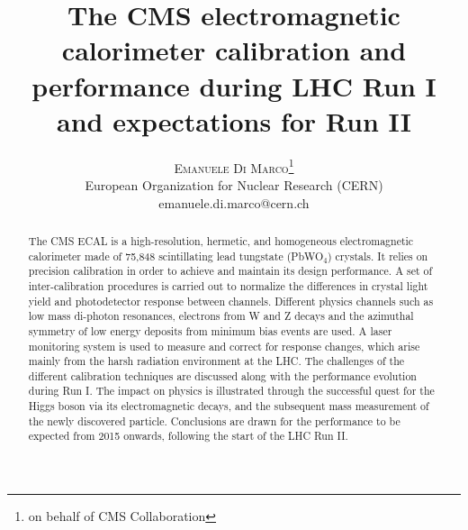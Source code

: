 \documentclass[11pt]{article}
\title{\vspace{-15mm}\fontsize{14pt}{8pt}\selectfont\textbf{The CMS electromagnetic calorimeter calibration and  performance during LHC Run I and expectations for Run II}} %
\author{
\large
\textsc{Emanuele Di Marco}\thanks{ on behalf of CMS Collaboration}\\[2mm] %
European Organization for Nuclear Research (CERN) \\ %
emanuele.di.marco@cern.ch %
\vspace{-5mm}
}
\date{}
\begin{document}
\maketitle %


\begin{abstract}
\noindent The CMS ECAL is a high-resolution, hermetic, and homogeneous
electromagnetic calorimeter made of 75,848 scintillating lead
tungstate (PbWO$_4$) crystals. It relies on precision calibration in
order to achieve and maintain its design performance. A set of
inter-calibration procedures is carried out to normalize the
differences in crystal light yield and photodetector response between
channels. Different physics channels such as low mass di-photon
resonances, electrons from W and Z decays and the azimuthal symmetry
of low energy deposits from minimum bias events are used. A laser
monitoring system is used to measure and correct for response changes,
which arise mainly from the harsh radiation environment at the
LHC. The challenges of the different calibration techniques are
discussed along with the performance evolution during Run I. The
impact on physics is illustrated through the successful quest for the
Higgs boson via its electromagnetic decays, and the subsequent mass
measurement of the newly discovered particle. Conclusions are drawn
for the performance to be expected from 2015 onwards, following the
start of the LHC Run II.
\end{abstract}
\end{document}
